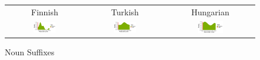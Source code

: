 \documentclass[11pt,letterpaper]{article}
\begin{document}
\begin{figure}
\begin{tabular}{ccc}
Finnish & Turkish & Hungarian \\
    \includegraphics[width=0.3\textwidth]{figures/finnish_nouns/suffixes-byMorphemes-auc-hist-heldout-Coarse-FineSurprisal-optimized.pdf}
    &
    \includegraphics[width=0.3\textwidth]{figures/turkish_nouns/suffixes-byMorphemes-auc-hist-heldout-Coarse-FineSurprisal-optimized.pdf}
    &
    \includegraphics[width=0.3\textwidth]{figures/hungarian_nouns/suffixes-byMorphemes-auc-hist-heldout-Coarse-FineSurprisal-optimized.pdf}
    \end{tabular}
    \caption{Noun Suffixes}
    \label{fig:my-label}
\end{figure}
\end{document}
